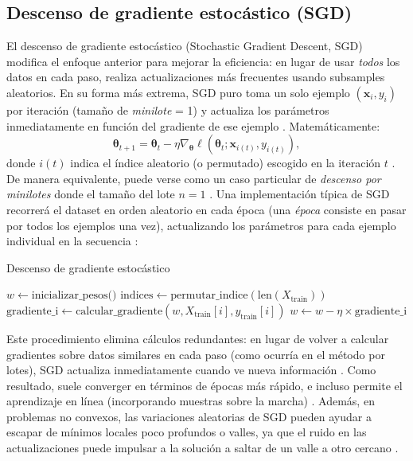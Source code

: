 \documentclass[12pt, spanish]{article}
\begin{document}
\subsection{Descenso de gradiente estocástico (SGD)}
El descenso de gradiente estocástico (Stochastic Gradient Descent, SGD) modifica el enfoque anterior para mejorar la eficiencia: en lugar de usar \textit{todos} los datos en cada paso, realiza actualizaciones más frecuentes usando subsamples aleatorios. En su forma más extrema, SGD puro toma un solo ejemplo $(\mathbf{x}_i, y_i)$ por iteración (tamaño de \textit{minilote} = 1) y actualiza los parámetros inmediatamente en función del gradiente de ese ejemplo \cite{ref1}. Matemáticamente:
\[
\boldsymbol{\theta}_{t+1} = \boldsymbol{\theta}_t - \eta \nabla_{\boldsymbol{\theta}} \ell(\boldsymbol{\theta}_t; \mathbf{x}_{i(t)}, y_{i(t)}),
\]
donde $i(t)$ indica el índice aleatorio (o permutado) escogido en la iteración $t$ \cite{ref1}. De manera equivalente, puede verse como un caso particular de \textit{descenso por minilotes} donde el tamaño del lote $n=1$ \cite{ref1}. Una implementación típica de SGD recorrerá el dataset en orden aleatorio en cada época (una \textit{época} consiste en pasar por todos los ejemplos una vez), actualizando los parámetros para cada ejemplo individual en la secuencia \cite{ref1}:

\begin{algorithm}[H]
\caption{Descenso de gradiente estocástico}
\begin{algorithmic}[1]
\State $w \gets \text{inicializar\_pesos()}$
    \State $\text{indices} \gets \text{permutar\_indice}(\text{len}(X_{\text{train}}))$
        \State $\text{gradiente\_i} \gets \text{calcular\_gradiente}(w, X_{\text{train}}[i], y_{\text{train}}[i])$
        \State $w \gets w - \eta \times \text{gradiente\_i}$ 
    \EndFor
\EndFor
\end{algorithmic}
\end{algorithm}

Este procedimiento elimina cálculos redundantes: en lugar de volver a calcular gradientes sobre datos similares en cada paso (como ocurría en el método por lotes), SGD actualiza inmediatamente cuando ve nueva información \cite{ref7}. Como resultado, suele converger en términos de épocas más rápido, e incluso permite el aprendizaje en línea (incorporando muestras sobre la marcha) \cite{ref1}. Además, en problemas no convexos, las variaciones aleatorias de SGD pueden ayudar a escapar de mínimos locales poco profundos o valles, ya que el ruido en las actualizaciones puede impulsar a la solución a saltar de un valle a otro cercano \cite{ref9}.
\end{document}
